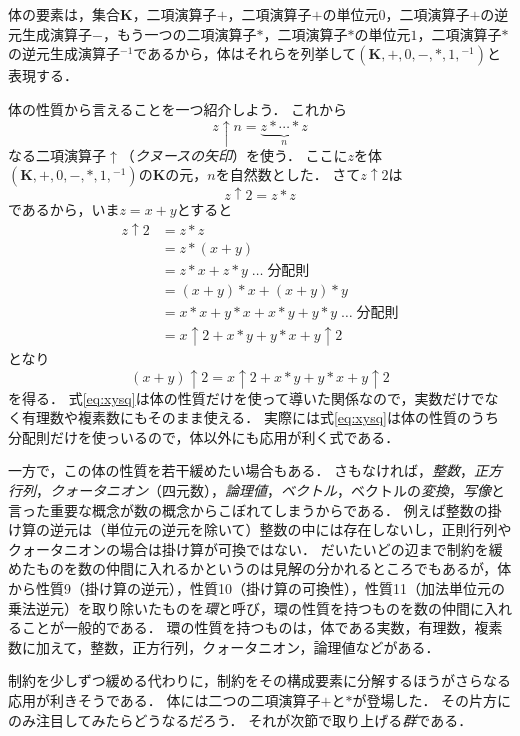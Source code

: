 \documentclass[twocolumn]{jsbook}
\newcommand{\mathSet}[1]{\mathbf{#1}}
\newcommand{\mathField}[7]{(#1,#2,#3,#4,#5,#6,#7)}
\newcommand{\keyword}[1]{\emph{#1}}
\begin{document}
体の要素は，集合$\mathSet{K}$，二項演算子$+$，二項演算子$+$の単位元$0$，二項演算子$+$の逆元生成演算子$-$，もう一つの二項演算子$*$，二項演算子$*$の単位元$1$，二項演算子$*$の逆元生成演算子${}^{-1}$であるから，体はそれらを列挙して$\mathField{\mathSet{K}}{+}{0}{-}{*}{1}{{}^{-1}}$と表現する．

体の性質から言えることを一つ紹介しよう．
これから$$z\uparrow n=\underbrace{z*\dotsb*z}_n$$なる二項演算子$\uparrow$（\keyword{クヌースの矢印}）を使う．
ここに$z$を体$\mathField{\mathSet{K}}{+}{0}{-}{*}{1}{{}^{-1}}$の$\mathSet{K}$の元，$n$を自然数とした．
さて$z\uparrow2$は$$z\uparrow2=z*z$$であるから，いま$z=x+y$とすると
\begin{align*}
z\uparrow2&=z*z\\
&=z*(x+y)\\
&=z*x+z*y\;\dots\;\text{分配則}\\
&=(x+y)*x+(x+y)*y\\
&=x*x+y*x+x*y+y*y\;\dots\;\text{分配則}\\
&=x\uparrow2+x*y+y*x+y\uparrow2
\end{align*}
となり
\begin{equation}
\label{eq:xysq}
(x+y)\uparrow2=x\uparrow2+x*y+y*x+y\uparrow2
\end{equation}
を得る．
式\eqref{eq:xysq}は体の性質だけを使って導いた関係なので，実数だけでなく有理数や複素数にもそのまま使える．
実際には式\eqref{eq:xysq}は体の性質のうち分配則だけを使っいるので，体以外にも応用が利く式である．

一方で，この体の性質を若干緩めたい場合もある．
さもなければ，\keyword{整数}，\keyword{正方行列}，\keyword{クォータニオン}（四元数），\keyword{論理値}，\keyword{ベクトル}，ベクトルの\keyword{変換}，\keyword{写像}と言った重要な概念が数の概念からこぼれてしまうからである．
例えば整数の掛け算の逆元は（単位元の逆元を除いて）整数の中には存在しないし，正則行列やクォータニオンの場合は掛け算が可換ではない．
だいたいどの辺まで制約を緩めたものを数の仲間に入れるかというのは見解の分かれるところでもあるが，体から性質9（掛け算の逆元），性質10（掛け算の可換性），性質11（加法単位元の乗法逆元）を取り除いたものを\keyword{環}と呼び，環の性質を持つものを数の仲間に入れることが一般的である．
環の性質を持つものは，体である実数，有理数，複素数に加えて，整数，正方行列，クォータニオン，論理値などがある．

制約を少しずつ緩める代わりに，制約をその構成要素に分解するほうがさらなる応用が利きそうである．
体には二つの二項演算子$+$と$*$が登場した．
その片方にのみ注目してみたらどうなるだろう．
それが次節で取り上げる\keyword{群}である．
\end{document}
